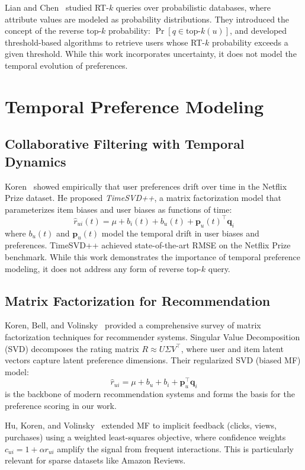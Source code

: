 Lian and Chen~\cite{lian2010probabilistic} studied RT-$k$ queries over probabilistic databases, where attribute values are modeled as probability distributions. They introduced the concept of the reverse top-$k$ probability: $\Pr[q \in \text{top-}k(u)]$, and developed threshold-based algorithms to retrieve users whose RT-$k$ probability exceeds a given threshold. While this work incorporates uncertainty, it does not model the temporal evolution of preferences.

\section{Temporal Preference Modeling}

\subsection{Collaborative Filtering with Temporal Dynamics}

Koren~\cite{koren2009temporal} showed empirically that user preferences drift over time in the Netflix Prize dataset. He proposed \textit{TimeSVD++}, a matrix factorization model that parameterizes item biases and user biases as functions of time:
\[
  \hat{r}_{ui}(t) = \mu + b_i(t) + b_u(t) + \mathbf{p}_u(t)^\top \mathbf{q}_i
\]
where $b_u(t)$ and $\mathbf{p}_u(t)$ model the temporal drift in user biases and preferences. TimeSVD++ achieved state-of-the-art RMSE on the Netflix Prize benchmark. While this work demonstrates the importance of temporal preference modeling, it does not address any form of reverse top-$k$ query.

\subsection{Matrix Factorization for Recommendation}

Koren, Bell, and Volinsky~\cite{koren2009matrix} provided a comprehensive survey of matrix factorization techniques for recommender systems. Singular Value Decomposition (SVD) decomposes the rating matrix $R \approx U \Sigma V^\top$, where user and item latent vectors capture latent preference dimensions. Their regularized SVD (biased MF) model:
\[
  \hat{r}_{ui} = \mu + b_u + b_i + \mathbf{p}_u^\top \mathbf{q}_i
\]
is the backbone of modern recommendation systems and forms the basis for the preference scoring in our work.

Hu, Koren, and Volinsky~\cite{hu2008collaborative} extended MF to implicit feedback (clicks, views, purchases) using a weighted least-squares objective, where confidence weights $c_{ui} = 1 + \alpha r_{ui}$ amplify the signal from frequent interactions. This is particularly relevant for sparse datasets like Amazon Reviews.

